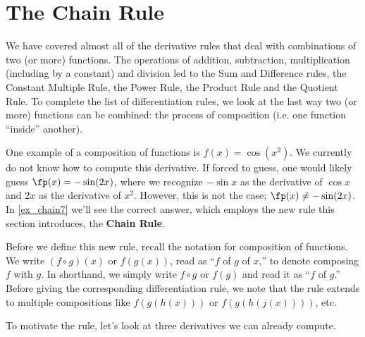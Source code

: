 \section{The Chain Rule}\label{sec:chainrule}

We have covered almost all of the derivative rules that deal with combinations of two (or more) functions.  The operations of addition, subtraction, multiplication (including by a constant) and division led to the Sum and Difference rules, the Constant Multiple Rule, the Power Rule, the Product Rule and the Quotient Rule.  %
To complete the list of differentiation rules, we look at the last way two (or more) functions can be combined: the process of composition (i.e. one function ``inside''  another).

One example of a composition of functions is $f(x) = \cos(x^2)$. We currently do not know how to compute this derivative. If forced to guess, one would likely guess $\fp(x) = -\sin(2x)$, where we recognize $-\sin x$ as the derivative of $\cos x$ and $2x$ as the derivative of $x^2$. However, this is not the case; $\fp(x)\neq -\sin(2x)$. In \autoref{ex_chain7} we'll see the correct answer, which employs the new rule this section introduces, the \textbf{Chain Rule}. 

Before we define this new rule, recall the notation for composition of functions. We write $(f \circ g)(x)$ or $f(g(x))$, read as ``$f$ of $g$ of $x$,'' to denote composing $f$ with $g$.  In shorthand, we simply write
$f \circ g$ or $f(g)$ and read it as ``$f$ of $g$.''  Before giving the corresponding differentiation rule, we note that the rule extends to multiple compositions like $f(g(h(x)))$ or $f(g(h(j(x))))$, etc.

To motivate the rule, let's look at three derivatives we can already compute.

